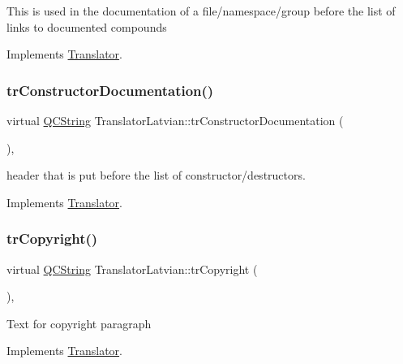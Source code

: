 This is used in the documentation of a file/namespace/group before the list of links to documented compounds 

Implements \mbox{\hyperlink{class_translator}{Translator}}.

\mbox{\label{class_translator_latvian_a27b6dbfbd8e73eed1e4834e71b56b767}} 
\subsubsection{\texorpdfstring{trConstructorDocumentation()}{trConstructorDocumentation()}}
{\footnotesize\ttfamily virtual \mbox{\hyperlink{class_q_c_string}{Q\+C\+String}} Translator\+Latvian\+::tr\+Constructor\+Documentation (\begin{DoxyParamCaption}{ }\end{DoxyParamCaption})\hspace{0.3cm}{\ttfamily [inline]}, {\ttfamily [virtual]}}

header that is put before the list of constructor/destructors. 

Implements \mbox{\hyperlink{class_translator}{Translator}}.

\mbox{\label{class_translator_latvian_a9f2850846c016bf33121ecf1c07976f2}} 
\subsubsection{\texorpdfstring{trCopyright()}{trCopyright()}}
{\footnotesize\ttfamily virtual \mbox{\hyperlink{class_q_c_string}{Q\+C\+String}} Translator\+Latvian\+::tr\+Copyright (\begin{DoxyParamCaption}{ }\end{DoxyParamCaption})\hspace{0.3cm}{\ttfamily [inline]}, {\ttfamily [virtual]}}

Text for copyright paragraph 

Implements \mbox{\hyperlink{class_translator}{Translator}}.

\mbox{\label{class_translator_latvian_aa9b9f0017d09cd059c0b7ee6f66379eb}} 
